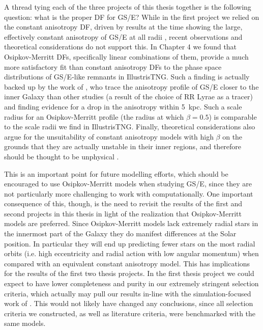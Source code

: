 A thread tying each of the three projects of this thesis together is the following question: what is the proper DF for GS/E? While in the first project we relied on the constant anisotropy DF, driven by results at the time showing the large, effectively constant anisotropy of GS/E at all radii \parencite[e.g.][]{belokurov18,lancaster19}, recent observations and theoretical considerations do not support this. In Chapter 4 we found that Osipkov-Merritt DFs, specifically linear combinations of them, provide a much more satisfactory fit than constant anisotropy DFs to the phase space distributions of GS/E-like remnants in IllustrisTNG. Such a finding is actually backed up by the work of \textcite{iorio21}, who trace the anisotropy profile of GS/E closer to the inner Galaxy than other studies (a result of the choice of RR Lyrae as a tracer) and finding evidence for a drop in the anisotropy within 5~kpc. Such a scale radius for an Osipkov-Merritt profile (the radius at which $\beta=0.5$) is comparable to the scale radii we find in IllustrisTNG. Finally, theoretical considerations also argue for the unsuitability of constant anisotropy models with high $\beta$ on the grounds that they are actually unstable in their inner regions, and therefore should be thought to be unphysical \parencite[see][and refernces therein]{binney12d}.

This is an important point for future modelling efforts, which should be encouraged to use Osipkov-Merritt models when studying GS/E, since they are not particularly more challenging to work with computationally. One important consequence of this, though, is the need to revisit the results of the first and second projects in this thesis in light of the realization that Osipkov-Merritt models are preferred. Since Osipkov-Merritt models lack extremely radial stars in the innermost part of the Galaxy they do manifest differences at the Solar position. In particular they will end up predicting fewer stars on the most radial orbits (i.e. high eccentricity and radial action with low angular momentum) when compared with an equivalent constant anisotropy model. This has implications for the results of the first two thesis projects. In the first thesis project we could expect to have lower completeness and purity in our extremely stringent selection criteria, which actually may pull our results in-line with the simulation-focused work of \textcite{carrillo23}. This would not likely have changed any conclusions, since all selection criteria we constructed, as well as literature criteria, were benchmarked with the same models.

